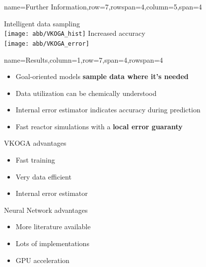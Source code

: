 \documentclass[
	accentcolor=3c,
	boxstyle=colored, %
	colorback=false,
	title=small
	]{tudasciposter}
\begin{document}
\begin{tcbposter}[
	poster={
		columns=8,
		rows=12,
		spacing=1cm,
	},]
\begin{posterboxenv}{name=Further Information,row=7,rowspan=4,column=5,span=4}
	\vspace{.5cm}
	\begin{multicols}{2}
		{\LARGE \centering Intelligent data sampling\\}
		\vspace{3cm}
		\texttt{[image: abb/VKOGA\_hist]}
		\columnbreak
		{\LARGE \centering Increased accuracy\\}
		\vspace{3cm}
		\texttt{[image: abb/VKOGA\_error]} %
	\end{multicols}	
\end{posterboxenv}

\begin{posterboxenv}[title=3. Results]{name=Results,column=1,row=7,span=4,rowspan=4}
	\begin{itemize}
		\item Goal-oriented models \textbf{sample data where it's needed}
		\item Data utilization can be chemically understood
		\item Internal error estimator indicates accuracy during prediction
		\item Fast reactor simulations with a \textbf{local error guaranty}
	\end{itemize}
	\vspace{3cm}

	\begin{multicols}{2}
		VKOGA advantages
		\begin{itemize}
			\item[\textcolor{tudunkeltürkis}{\bullet}] Fast training
			\item[\textcolor{tudunkeltürkis}{\bullet}] Very data efficient
			\item[\textcolor{tudunkeltürkis}{\bullet}] Internal error estimator
		\end{itemize}
		\columnbreak
		Neural Network advantages
		\begin{itemize}
			\item[\textcolor{turot}{\bullet}] More literature available
			\item[\textcolor{turot}{\bullet}] Lots of implementations
			\item[\textcolor{turot}{\bullet}] GPU acceleration
		\end{itemize}
	\end{multicols}
	

\end{posterboxenv}
\end{tcbposter}
\end{document}
